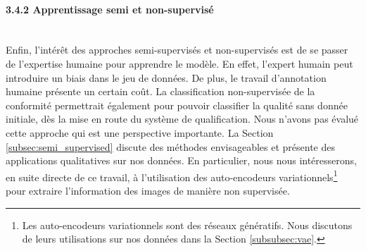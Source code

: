 \paragraph{3.4.2 Apprentissage semi et non-supervisé} \mbox{} \\
Enfin, l'intérêt des approches semi-supervisés et non-supervisés est de se passer de l'expertise humaine pour apprendre le modèle.
En effet, l'expert humain peut introduire un biais dans le jeu de données.
De plus, le travail d'annotation humaine présente un certain coût.
La classification non-supervisée de la conformité permettrait également pour pouvoir classifier la qualité sans donnée initiale, dès la mise en route du système de qualification.
Nous n'avons pas évalué cette approche qui est une perspective importante.
La Section \ref{subsec:semi_supervised} discute des méthodes envisageables et présente des applications qualitatives sur nos données.
En particulier, nous nous intéresserons, en suite directe de ce travail, à l'utilisation des auto-encodeurs variationnels\footnote{Les auto-encodeurs variationnels sont des réseaux génératifs. Nous discutons de leurs utilisations sur nos données dans la Section \ref{subsubsec:vae}.} pour extraire l'information des images de manière non supervisée.

